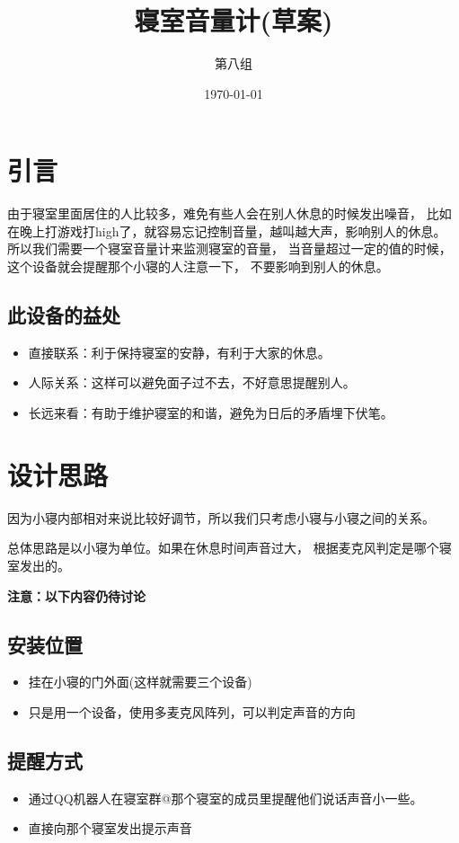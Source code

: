 \documentclass[12pt, a4paper, oneside]{ctexart}
\title{寝室音量计(草案)}
\author{第八组}
\date{\today}
\begin{document}
\maketitle


\section{引言}
由于寝室里面居住的人比较多，难免有些人会在别人休息的时候发出噪音，
比如在晚上打游戏打high了，就容易忘记控制音量，越叫越大声，影响别人的休息。
所以我们需要一个寝室音量计来监测寝室的音量，
当音量超过一定的值的时候，这个设备就会提醒那个小寝的人注意一下，
不要影响到别人的休息。
\subsection*{此设备的益处}
\begin{itemize}
    \item 直接联系：利于保持寝室的安静，有利于大家的休息。
    \item 人际关系：这样可以避免面子过不去，不好意思提醒别人。
    \item 长远来看：有助于维护寝室的和谐，避免为日后的矛盾埋下伏笔。
\end{itemize}

\section{设计思路}
因为小寝内部相对来说比较好调节，所以我们只考虑小寝与小寝之间的关系。

总体思路是以小寝为单位。如果在休息时间声音过大，
根据麦克风判定是哪个寝室发出的。



\textbf{ 注意：以下内容仍待讨论}

\subsection{安装位置}

\begin{itemize}
    \item 挂在小寝的门外面(这样就需要三个设备)
    \item 只是用一个设备，使用多麦克风阵列，可以判定声音的方向
\end{itemize}

\subsection{提醒方式}
\begin{itemize}
    \item 通过QQ机器人在寝室群@那个寝室的成员里提醒他们说话声音小一些。
    \item 直接向那个寝室发出提示声音
\end{itemize}
\end{document}
